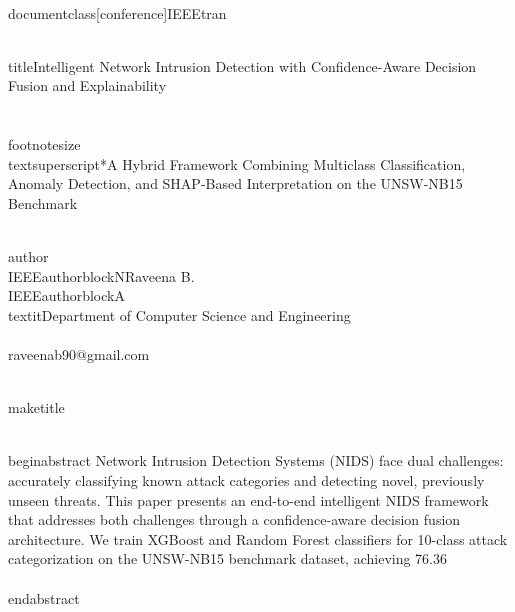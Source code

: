 \\documentclass[conference]{IEEEtran}
\begin{document}
\\title{Intelligent Network Intrusion Detection with Confidence-Aware Decision Fusion and Explainability\\\\
{\\footnotesize \\textsuperscript{*}A Hybrid Framework Combining Multiclass Classification, Anomaly Detection, and SHAP-Based Interpretation on the UNSW-NB15 Benchmark}
}

\\author{\\IEEEauthorblockN{Raveena B.}
\\IEEEauthorblockA{\\textit{Department of Computer Science and Engineering} \\\\
raveenab90@gmail.com}
}

\\maketitle

\\begin{abstract}
Network Intrusion Detection Systems (NIDS) face dual challenges: accurately classifying known attack categories and detecting novel, previously unseen threats. This paper presents an end-to-end intelligent NIDS framework that addresses both challenges through a confidence-aware decision fusion architecture. We train XGBoost and Random Forest classifiers for 10-class attack categorization on the UNSW-NB15 benchmark dataset, achieving 76.36\\%
\\end{abstract}
\end{document}
